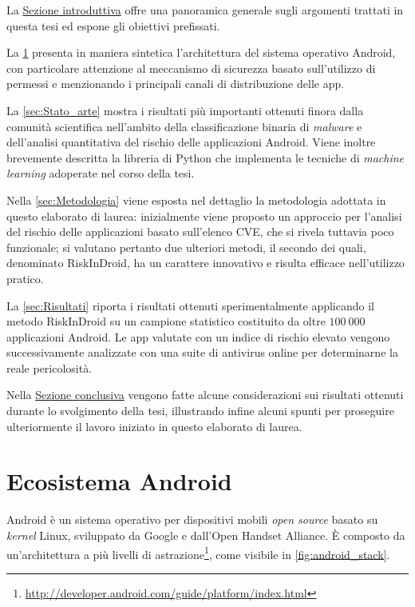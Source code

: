 \documentclass[12pt,a4paper,oneside]{article}
\begin{document}
La \hyperref[sec:Introduzione]{Sezione introduttiva} offre una panoramica generale sugli argomenti trattati in questa tesi ed espone gli obiettivi prefissati.

La \cref{sec:Android} presenta in maniera sintetica l'architettura del sistema operativo Android, con particolare attenzione al meccanismo di sicurezza basato sull'utilizzo di permessi e menzionando i principali canali di distribuzione delle app.

La \cref{sec:Stato_arte} mostra i risultati più importanti ottenuti finora dalla comunità scientifica nell'ambito della classificazione binaria di \textit{malware} e dell'analisi quantitativa del rischio delle applicazioni Android. Viene inoltre brevemente descritta la libreria di Python che implementa le tecniche di \textit{machine learning} adoperate nel corso della tesi.

Nella \cref{sec:Metodologia} viene esposta nel dettaglio la metodologia adottata in questo elaborato di laurea: inizialmente viene proposto un approccio per l'analisi del rischio delle applicazioni basato sull'elenco \acrshort{CVE}, che si rivela tuttavia poco funzionale; si valutano pertanto due ulteriori metodi, il secondo dei quali, denominato RiskInDroid, ha un carattere innovativo e risulta efficace nell'utilizzo pratico.

La \cref{sec:Risultati} riporta i risultati ottenuti sperimentalmente applicando il metodo RiskInDroid su un campione statistico costituito da oltre $100~000$ applicazioni Android. Le app valutate con un indice di rischio elevato vengono successivamente analizzate con una suite di antivirus online per determinarne la reale pericolosità.

Nella \hyperref[sec:Conclusioni]{Sezione conclusiva} vengono fatte alcune considerazioni sui risultati ottenuti durante lo svolgimento della tesi, illustrando infine alcuni spunti per proseguire ulteriormente il lavoro iniziato in questo elaborato di laurea.
\newpage





\section{Ecosistema Android}\label{sec:Android}

Android è un sistema operativo per dispositivi mobili \textit{open source} basato su \textit{kernel} Linux, sviluppato da Google e dall'Open Handset Alliance. È composto da un'architettura a più livelli di astrazione\footnote{\url{http://developer.android.com/guide/platform/index.html}}, come visibile in \cref{fig:android_stack}.
\end{document}
